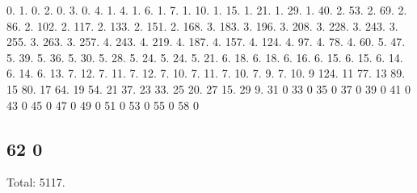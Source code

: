 0. 1. 0. 2. 0. 3. 0. 4. 1. 4. 1. 6. 1. 7. 1. 10. 1. 15. 1. 21. 1. 29. 1. 40. 2. 53. 2. 69. 2. 86. 2. 102. 2. 117. 2. 133. 2. 151. 2. 168. 3. 183. 3. 196. 3. 208. 3. 228. 3. 243. 3. 255. 3. 263. 3. 257. 4. 243. 4. 219. 4. 187. 4. 157. 4. 124. 4. 97. 4. 78. 4. 60. 5. 47. 5. 39. 5. 36. 5. 30. 5. 28. 5. 24. 5. 24. 5. 21. 6. 18. 6. 18. 6. 16. 6. 15. 6. 15. 6. 14. 6. 14. 6. 13. 7. 12. 7. 11. 7. 12. 7. 10. 7. 11. 7. 10. 7. 9. 7. 10. 9 124. 11 77. 13 89. 15 80. 17 64. 19 54. 21 37. 23 33. 25 20. 27 15. 29 9. 31 0 33 0 35 0 37 0 39 0 41 0 43 0 45 0 47 0 49 0 51 0 53 0 55 0 58 0 \subsection*{62 0 }

Total\+: 5117. 